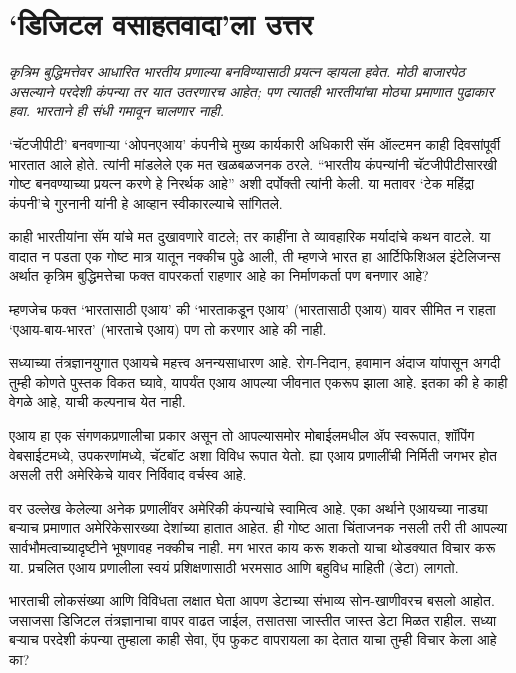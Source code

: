 \chapter{`डिजिटल वसाहतवादा'ला उत्तर }

{\textit{कृत्रिम बुद्धिमत्तेवर आधारित भारतीय प्रणाल्या बनविण्यासाठी प्रयत्न व्हायला हवेत. मोठी बाजारपेठ असल्याने परदेशी कंपन्या तर यात उतरणारच आहेत; पण त्यातही भारतीयांचा मोठ्या प्रमाणात पुढाकार हवा. भारताने ही संधी गमावून चालणार नाही.}}

\vspace{1.5em}

`चॅटजीपीटी' बनवणाऱ्या `ओपनएआय' कंपनीचे मुख्य कार्यकारी अधिकारी सॅम ऑल्टमन काही दिवसांपूर्वी भारतात आले होते. त्यांनी मांडलेले एक मत खळबळजनक ठरले. ``भारतीय कंपन्यांनी चॅटजीपीटीसारखी गोष्ट बनवण्याच्या प्रयत्न करणे हे निरर्थक आहे'' अशी दर्पोक्ती त्यांनी केली. या मतावर `टेक महिंद्रा कंपनी'चे गुरनानी यांनी हे आव्हान स्वीकारल्याचे सांगितले.

काही भारतीयांना सॅम यांचे मत दुखावणारे वाटले; तर काहींना ते व्यावहारिक मर्यादांचे कथन वाटले. या वादात न पडता एक गोष्ट मात्र यातून नक्कीच पुढे आली, ती म्हणजे भारत हा आर्टिफिशिअल इंटेलिजन्स अर्थात कृत्रिम बुद्धिमत्तेचा फक्त वापरकर्ता राहणार आहे का निर्माणकर्ता पण बनणार आहे?

म्हणजेच फक्त `भारतासाठी एआय' की `भारताकडून एआय' (भारतासाठी एआय) यावर सीमित न राहता `एआय-बाय-भारत' (भारताचे एआय) पण तो करणार आहे की नाही.

सध्याच्या तंत्रज्ञानयुगात एआयचे महत्त्व अनन्यसाधारण आहे. रोग-निदान, हवामान अंदाज यांपासून अगदी तुम्ही कोणते पुस्तक विकत घ्यावे, यापर्यंत एआय आपल्या जीवनात एकरूप झाला आहे. इतका की हे काही वेगळे आहे, याची कल्पनाच येत नाही.

एआय हा एक संगणकप्रणालीचा प्रकार असून तो आपल्यासमोर मोबाईलमधील ॲप स्वरूपात, शॉपिंग वेबसाईटमध्ये, उपकरणांमध्ये, चॅटबॉट अशा विविध रूपात येतो. ह्या एआय प्रणालींची निर्मिती जगभर होत असली तरी अमेरिकेचे यावर निर्विवाद वर्चस्व आहे.

वर उल्लेख केलेल्या अनेक प्रणालींवर अमेरिकी कंपन्यांचे स्वामित्व आहे. एका अर्थाने एआयच्या नाड्या बऱ्याच प्रमाणात अमेरिकेसारख्या देशांच्या हातात आहेत. ही गोष्ट आता चिंताजनक नसली तरी ती आपल्या सार्वभौमत्वाच्यादृष्टीने भूषणावह नक्कीच नाही. मग भारत काय करू शकतो याचा थोडक्यात विचार करू या. प्रचलित एआय प्रणालीला स्वयं प्रशिक्षणासाठी भरमसाठ आणि बहुविध माहिती (डेटा) लागतो.

भारताची लोकसंख्या आणि विविधता लक्षात घेता आपण डेटाच्या संभाव्य सोन-खाणीवरच बसलो आहोत. जसाजसा डिजिटल तंत्रज्ञानाचा वापर वाढत जाईल, तसातसा जास्तीत जास्त डेटा मिळत राहील. सध्या बऱ्याच परदेशी कंपन्या तुम्हाला काही सेवा, ऍप फुकट वापरायला का देतात याचा तुम्ही विचार केला आहे का?

